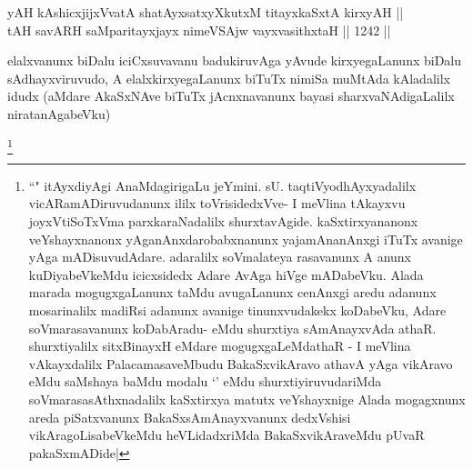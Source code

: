 
\begin{shl}
yAH kAshicxjijxVvatA shatAyxsatxyXkutxM titayxkaSxtA kirxyAH || \\
tAH savARH saMparitayxjayx nimeVSAjw vayxvasithxtaH ||  1242 ||  
\end{shl}

\begin{artha}
elalxvanunx biDalu iciCxsuvavanu badukiruvAga yAvude kirxyegaLanunx biDalu sAdhayxviruvudo, A elalxkirxyegaLanunx biTuTx nimiSa muMtAda kAladalilx idudx (aMdare AkaSxNAve biTuTx jAcnxnavanunx bayasi sharxvaNAdigaLalilx niratanAgabeVku)
\end{artha}

\begin{artha}
\footnote{``\stext" itAyxdiyAgi AnaMdagirigaLu jeYmini. sU. taqtiVyodhAyxyadalilx vicARamADiruvudanunx ililx toVrisidedxVve- I meVlina tAkayxvu joyxVtiSoTxVma parxkaraNadalilx shurxtavAgide. kaSxtirxyananonx veYshayxnanonx yAganAnxdarobabxnanunx yajamAnanAnxgi iTuTx avanige yAga mADisuvudAdare. adaralilx soVmalateya rasavanunx A anunx kuDiyabeVkeMdu icicxsidedx Adare AvAga hiVge mADabeVku. Alada marada mogugxgaLanunx taMdu avugaLanunx cenAnxgi aredu adanunx mosarinalilx madiRsi adanunx avanige tinunxvudakekx koDabeVku, Adare soVmarasavanunx koDabAradu- eMdu shurxtiya sAmAnayxvAda athaR. shurxtiyalilx sitxBinayxH eMdare mogugxgaLeMdathaR - I meVlina vAkayxdalilx PalacamasaveMbudu BakaSxvikAravo athavA yAga vikAravo eMdu saMshaya baMdu modalu `\stext' eMdu shurxtiyiruvudariMda soVmarasasAthxnadalilx kaSxtirxya matutx veYshayxnige Alada mogagxnunx areda piSatxvanunx BakaSxsAmAnayxvanunx dedxVshisi vikAragoLisabeVkeMdu heVLidadxriMda BakaSxvikAraveMdu pUvaR pakaSxmADide|}
\end{artha}


